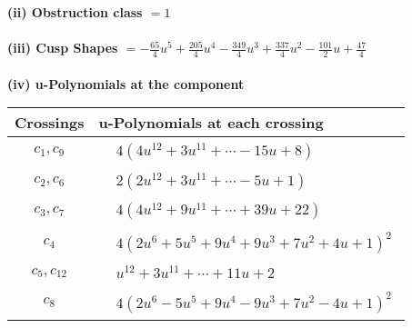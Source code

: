 \documentclass[1p]{elsarticle_modified}
\theoremstyle{definition}
\begin{document}
\flushleft \textbf{(ii) Obstruction class $= 1$}\\~\\
\flushleft \textbf{(iii) Cusp Shapes $= -\frac{65}{4} u^5+\frac{205}{4} u^4-\frac{349}{4} u^3+\frac{337}{4} u^2-\frac{101}{2} u+\frac{47}{4}$}\\~\\
\newpage\renewcommand{\arraystretch}{1}
\flushleft \textbf{(iv) u-Polynomials at the component}\newline \\
\begin{tabular}{m{50pt}|m{274pt}}
Crossings & \hspace{64pt}u-Polynomials at each crossing \\
\hline $$\begin{aligned}c_{1},c_{9}\end{aligned}$$&$\begin{aligned}
&4(4 u^{12}+3 u^{11}+\cdots-15 u+8)
\end{aligned}$\\
\hline $$\begin{aligned}c_{2},c_{6}\end{aligned}$$&$\begin{aligned}
&2(2 u^{12}+3 u^{11}+\cdots-5 u+1)
\end{aligned}$\\
\hline $$\begin{aligned}c_{3},c_{7}\end{aligned}$$&$\begin{aligned}
&4(4 u^{12}+9 u^{11}+\cdots+39 u+22)
\end{aligned}$\\
\hline $$\begin{aligned}c_{4}\end{aligned}$$&$\begin{aligned}
&4(2 u^6+5 u^5+9 u^4+9 u^3+7 u^2+4 u+1)^2
\end{aligned}$\\
\hline $$\begin{aligned}c_{5},c_{12}\end{aligned}$$&$\begin{aligned}
&u^{12}+3 u^{11}+\cdots+11 u+2
\end{aligned}$\\
\hline $$\begin{aligned}c_{8}\end{aligned}$$&$\begin{aligned}
&4(2 u^6-5 u^5+9 u^4-9 u^3+7 u^2-4 u+1)^2
\end{aligned}$\\

\end{tabular}
\end{document}
